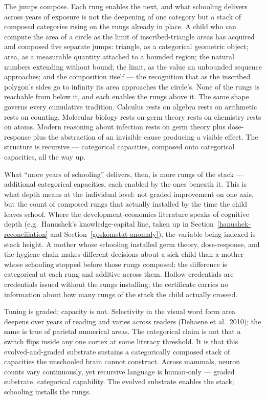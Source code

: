 \documentclass[12pt,letterpaper]{article}
\begin{document}
The jumps compose. Each rung enables the next, and what schooling
delivers across years of exposure is not the deepening of one
category but a stack of composed categories rising on the rungs
already in place. A child who can compute the area of a circle as
the limit of inscribed-triangle areas has acquired and composed
five separate jumps: triangle, as a categorical geometric object;
area, as a measurable quantity attached to a bounded region; the
natural numbers extending without bound; the limit, as the value an
unbounded sequence approaches; and the composition itself --- the
recognition that as the inscribed polygon's sides go to infinity
its area approaches the circle's. None of the rungs is reachable
from below it, and each enables the rungs above it. The same shape
governs every cumulative tradition. Calculus rests on algebra rests
on arithmetic rests on counting. Molecular biology rests on germ
theory rests on chemistry rests on atoms. Modern reasoning about
infection rests on germ theory plus dose-response plus the
abstraction of an invisible cause producing a visible effect. The
structure is recursive --- categorical capacities, composed onto
categorical capacities, all the way up.

What ``more years of schooling'' delivers, then, is more rungs of
the stack --- additional categorical capacities, each enabled by
the ones beneath it. This is what depth means at the individual
level: not graded improvement on one axis, but the count of
composed rungs that actually installed by the time the child leaves
school. Where the development-economics literature speaks of cognitive
depth (e.g.\ Hanushek's knowledge-capital line, taken up in
Section~\ref{hanushek-reconciliation} and
Section~\ref{goskomstat-anomaly}), the variable being indexed is
stack height. A mother whose schooling installed germ theory,
dose-response, and the hygiene chain makes different decisions
about a sick child than a mother whose schooling stopped before
those rungs composed; the difference is categorical at each rung
and additive across them. Hollow credentials are credentials issued
without the rungs installing; the certificate carries no
information about how many rungs of the stack the child actually
crossed.

Tuning is graded; capacity is not. Selectivity in the visual word
form area deepens over years of reading and varies across readers
(Dehaene et al.\ 2010); the same is true of parietal numerical areas.
The categorical claim is not that a switch flips inside any one
cortex at some literacy threshold. It is that this evolved-and-graded
substrate sustains a categorically composed stack of capacities the
unschooled brain cannot construct. Across mammals, neuron counts
vary continuously, yet recursive language is human-only --- graded
substrate, categorical capability. The evolved substrate enables
the stack; schooling installs the rungs.
\end{document}
